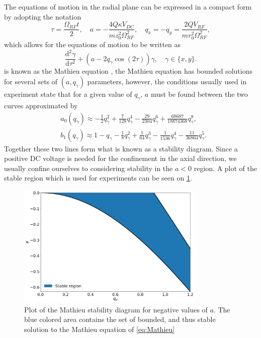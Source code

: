 The equations of motion in the radial plane can be expressed in a compact form by adopting the notation
\begin{equation}
    \tau = \frac{\Omega_{RF}t}{2},\quad a = -\frac{4Q\kappa V_{DC}}{mz_0^2\Omega_{RF}^2},\quad q_x = -q_y = 
    \frac{2QV_{RF}}{mr_0^2\Omega_{RF}^2},
\end{equation}
which allows for the equations of motion to be written as
\begin{equation}
    \frac{\text{d}^2\gamma}{\text{d}\tau^2} + (a-2q_\gamma\cos{(2\tau)})\gamma,\quad \gamma\in\{x,y\}
    \label{eq:Mathieu}.
\end{equation}
 is known as the Mathieu equation \cite{Abramowitz_1972}, the Mathieu equation has bounded solutions for several sets of $(a,q_\gamma)$ parameters,
however, the conditions usually used in experiment state that for a given value of $q_\gamma$, $a$ must be found between the two curves approximated by \cite{Abramowitz_1972}
\begin{align}
    &a_0(q_\gamma) \approx -\frac{1}{2}q_\gamma^2 +\frac{7}{128}q_\gamma^4 -\frac{29}{2304}q_\gamma^6+\frac{68687}{18874368}q_\gamma^8,\\
    &b_1(q_\gamma) \approx 1-q_\gamma-\frac{1}{8}q_\gamma^2+\frac{1}{64}q_\gamma^3-\frac{1}{1536}q_\gamma^4-\frac{11}{36864}q_\gamma^5.
\end{align}
Together these two lines form what is known as a stability diagram. Since a positive DC voltage is needed for the confinement in the axial direction, we usually confine ourselves to considering stability in the $a<0$ region. A plot of the stable region which is used for experiments can be seen on \cref{fig:Stability1}.
\begin{figure}
    \centering
    \includegraphics[width =0.8\textwidth]{main/Stability.png}
    \caption{Plot of the Mathieu stability diagram for negative values of $a$. The blue colored area contains the set of bounded, and thus stable solution to the Mathieu equation of \cref{eq:Mathieu}}
    \label{fig:Stability1}
\end{figure}

